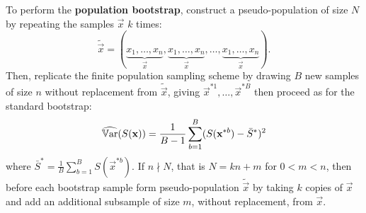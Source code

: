 \documentclass[10pt, a4paper]{article}
\begin{document}
To perform the \textbf{population bootstrap},
construct a pseudo-population of size $N$ by repeating the samples $\vec{x}$ $k$ times:
\[
\tilde{\vec{x}} = (\underbrace{x_1, \dotsc, x_n}_{\vec{x}}, \underbrace{x_1, \dotsc, x_n}_{\vec{x}}, \dotsc, \underbrace{x_1, \dotsc, x_n}_{\vec{x}}).
\]
Then,
replicate the finite population sampling scheme by drawing $B$ new samples of size $n$ without replacement from $\tilde{\vec{x}}$,
giving $\vec{x} ^ {*1}, \dotsc, \vec{x} ^ {*B}$ then proceed as for the standard bootstrap:
\[
\widehat{\mathbb{V}\mathrm{ar}}(S(\mathbf{x})) = \frac{1}{B - 1}\sum_{b = 1}^{B}(S(\mathbf{x} ^ {*b}) - \bar{S} ^ {*}) ^ 2
\]
where $\bar{S} ^ {*} = \frac{1}{B}\sum_{b = 1}^{B}S(\vec{x} ^ {*b})$.
If $n \nmid N$,
that is $N = kn + m$ for $0 < m < n$,
then before each bootstrap sample form pseudo-population $\tilde{\vec{x}}$ by taking $k$ copies of $\vec{x}$ and add an additional subsample of size $m$,
without replacement,
from $\vec{x}$.
\end{document}
